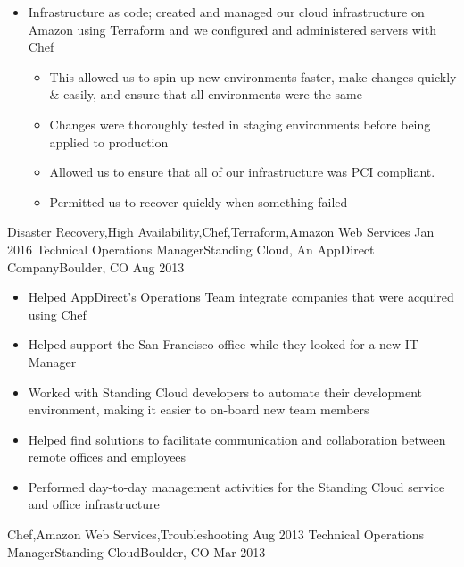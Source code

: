\begin{experiences}
{\begin{itemize}
                        \item Infrastructure as code; created and managed our cloud infrastructure on Amazon using Terraform and we configured and administered servers with Chef
                        \begin{itemize}
                          \item This allowed us to spin up new environments faster, make changes quickly \& easily, and ensure that all environments were the same
                          \item Changes were thoroughly tested in staging environments before being applied to production
                          \item Allowed us to ensure that all of our infrastructure was PCI compliant.
                          \item Permitted us to recover quickly when something failed
                        \end{itemize}
                      \end{itemize}
                    }
                    {Disaster Recovery,High Availability,Chef,Terraform,Amazon Web Services}
  \emptySeparator
  \experience
    {Jan 2016}      {Technical Operations Manager}{Standing Cloud, An AppDirect Company}{Boulder, CO}
    {Aug 2013}      {
                      \begin{itemize}
                        \item Helped AppDirect's Operations Team integrate companies that were acquired using Chef
                        \item Helped support the San Francisco office while they looked for a new IT Manager
                        \item Worked with Standing Cloud developers to automate their development environment, making it easier to on-board new team members
                        \item Helped find solutions to facilitate communication and collaboration between remote offices and employees
                        \item Performed day-to-day management activities for the Standing Cloud service and office infrastructure
                      \end{itemize}
                    }
                    {Chef,Amazon Web Services,Troubleshooting}
  \emptySeparator
  \experience
    {Aug 2013}      {Technical Operations Manager}{Standing Cloud}{Boulder, CO}
    {Mar 2013}      {
                      \begin{itemize}

\end{itemize}}
\end{experiences}
